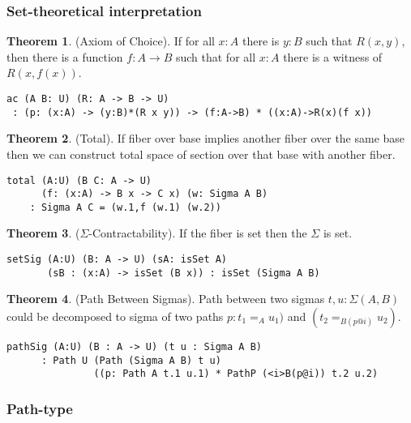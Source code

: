 \documentclass[twoside]{article}
\theoremstyle{definition}
\newtheorem{theorem}{Theorem}
\begin{document}
\subsubsection*{Set-theoretical interpretation}

\begin{theorem} (Axiom of Choice).
If for all $x : A$ there is $y : B$ such that $R(x,y)$,
then there is a function $f : A \rightarrow B$
such that for all $x : A$ there is a witness of $R(x,f(x))$.
\begin{lstlisting}
ac (A B: U) (R: A -> B -> U)
 : (p: (x:A) -> (y:B)*(R x y)) -> (f:A->B) * ((x:A)->R(x)(f x))
\end{lstlisting}
\end{theorem}

\begin{theorem} (Total).
If fiber over base implies another fiber
over the same base then we can construct total space of section
over that base with another fiber.
\begin{lstlisting}
total (A:U) (B C: A -> U)
      (f: (x:A) -> B x -> C x) (w: Sigma A B)
    : Sigma A C = (w.1,f (w.1) (w.2))
\end{lstlisting}
\end{theorem}

\begin{theorem} ($\Sigma$-Contractability). If the fiber is set then the $\Sigma$ is set.
\begin{lstlisting}
setSig (A:U) (B: A -> U) (sA: isSet A)
       (sB : (x:A) -> isSet (B x)) : isSet (Sigma A B)
\end{lstlisting}
\end{theorem}

\begin{theorem} (Path Between Sigmas).
Path between two sigmas $t,u: \Sigma(A,B)$ could be decomposed to
sigma of two paths $p:t_1=_{A}u_1)$ and $(t_2=_{B(p@i)}u_2)$.
\begin{lstlisting}
pathSig (A:U) (B : A -> U) (t u : Sigma A B)
      : Path U (Path (Sigma A B) t u)
               ((p: Path A t.1 u.1) * PathP (<i>B(p@i)) t.2 u.2)
\end{lstlisting}
\end{theorem}

\subsubsection{Path-type}
\end{document}
